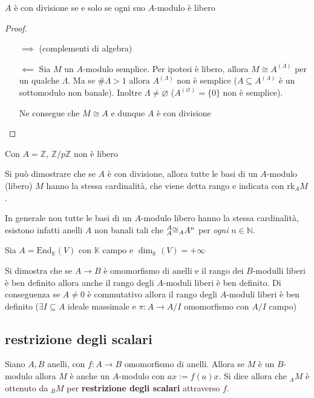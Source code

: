 \begin{proposition}{}
    \(A\) è con divisione se e solo se ogni suo \(A\)-modulo è libero
\end{proposition}
\begin{proof}\( \)
\begin{itemize}
    \item[\(\implies \)] (complementi di algebra)
    \item[\(\impliedby \)] Sia \(M\) un \(A\)-modulo semplice. Per ipotesi è
        libero, allora \(M \cong A^{{(\Lambda)}}\) per un qualche \(\Lambda\).
        Ma se \(\# \Lambda > 1\) allora \(A^{{(\Lambda)}}\) non è semplice (\(A \subseteq A^{{(\Lambda)}} \) è un sottomodulo non banale). Inoltre \(\Lambda\neq \varnothing\) (\(A^{{(\varnothing)}} = \{0\} \) non è semplice).

        Ne consegue che \(M\cong A\) e dunque \(A\) è con divisione 
\end{itemize}
\end{proof}
\begin{example}{}
    Con \(A = \mathbb{Z}\), \(\mathbb{Z} / p \mathbb{Z}\) non è libero
\end{example}

Si può dimostrare che se \(A\) è con divisione, allora tutte le basi di un \(A\)-modulo (libero) \(M\) hanno la stessa cardinalità, che viene detta rango e indicata con \(\mathrm{rk}_A M\).

In generale non tutte le basi di un \(A\)-modulo libero hanno la stessa
cardinalità, esistono infatti anelli \(A\) non banali tali che \(\prescript{A}{A} \cong _AA
^{n}\) per \emph{ogni} \(n \in \mathbb{N}\).

\begin{example}{}
    Sia \(A = \mathrm{End}_{\mathbb{K}} {(V)}\) con \(\mathbb{K}\) campo e \(\dim_{\mathbb{K}} {(V)} = +\infty\) 
\end{example}


Si dimostra che se \(A \to  B\) è omomorfismo di anelli e il rango dei \(B\)-modulli
liberi è ben definito allora anche il rango degli \(A\)-moduli liberi è ben
definito. Di conseguenza se \(A\neq 0 \) è commutativo allora il rango degli \(A\)-moduli liberi è ben definito (\(\exists I \subseteq A \) ideale massimale e \(\pi : A \to A/I\) omomorfismo con \(A / I\) campo)

\subsection{restrizione degli scalari}
Siano \(A, B\) anelli, con \(f : A \to B\) omomorfismo di anelli. Allora se \(M\) è un \(B\)-modulo allora \(M\) è anche un \(A\)-modulo con \(ax := f{(a)}x\). Si dice allora che \(
_A M\) è ottenuto da \(_B M\) per \textbf{restrizione degli scalari} attraverso
\(f\).


